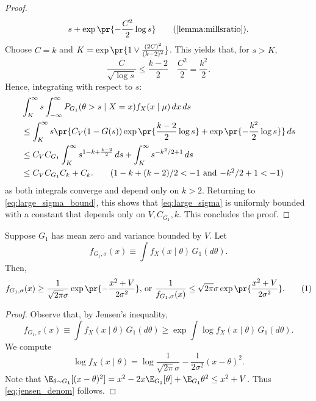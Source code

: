 \documentclass[12pt, reqno]{amsart}
\newcommand\numberthis{\addtocounter{equation}{1}\tag{\theequation}}
\numberwithin{equation}{section}
\begin{document}
\begin{refsection}
\begin{appendices}
\begin{proof}
\begin{align*}
{s} + \exp\pr{-\frac{C^2}{2} \log s} \tag{\cref{lemma:millsratio}}.
\end{align*}
Choose $C = k$ and $ K = \exp\pr{1 \vee \frac{(2C)^2}{(k-2)^2}}$. This yields that, for
$s > K$, \[
\frac{C}{\sqrt{\log s}}  \le \frac{k-2}{2} \quad \frac{C^2}{2} = \frac{k^2}{2}.
\]
Hence, integrating with respect to $s$: \begin{align*}
&\int_K^\infty s \int_{-\infty}^\infty P_{G_1}(\theta > s \mid X=x) f_X
(x\mid \mu)\,dx\,ds \\
&\le \int_K^\infty s 
\pr{C_V (1-G(s)) \exp\pr{ \frac{k-2}{2} \log
s} + \exp\pr{-\frac{k^2}{2} \log s}} \,ds \\
&\le C_{V} C_{G_1} \int_K^\infty s^{1-k+\frac{k-2}{2}}\,ds + \int_{K}^\infty s^{-k^2/2 +1}
\,ds \\
&\le C_V C_{G_1} C_k + C_k. \tag{$1-k+(k-2)/2 < -1$ and $-k^2/2+1 < -1$}
\end{align*}
as both integrals converge and depend only on $k > 2$. Returning to 
\eqref{eq:large_sigma_bound}, this shows that \eqref{eq:large_sigma} is uniformly bounded
with a constant that depends only on $V, C_{G_1}, k$. This concludes the proof.
\end{proof}

\begin{lemma}
\label{lemma:jensen_denom}
Suppose $G_1$ has mean zero and variance bounded by $V$. Let \[
f_{G_1, \sigma}(x) \equiv \int f_X(x\mid \theta) \, G_1(d\theta).
\] Then, \[
f_{G_1,\sigma}(x) \ge \frac{1}{\sqrt{2\pi}\sigma} \exp\pr{-\frac{x^2 + V}
{2\sigma^2}}
\text{, or }
\frac{1}{f_{G_1, \sigma}(x)} \le \sqrt{2\pi} \sigma \exp\pr{\frac{x^2 + V}{2\sigma^2}}.
\numberthis \label{eq:jensen_denom}
\]
\end{lemma}

\begin{proof}
Observe that, by Jensen's inequality, \[
f_{G_1, \sigma}(x) \equiv \int f_X(x\mid \theta) \, G_1(d\theta) \ge \exp \int \log f_X
(x\mid
\theta) \,G_1(d\theta).
\]
We compute \[
\log f_X(x \mid \theta) = \log\frac{1}{\sqrt{2\pi} \sigma} - \frac{1}{2\sigma^2} 
(x-\theta)^2. 
\]
Note that $\E_{\theta \sim G_1}[(x-\theta)^2] = x^2 - 2x \E_{G_1}[\theta] + \E_
{G_1}\theta^2 \le x^2 + V$.
Thus \eqref{eq:jensen_denom} follows. \end{proof}



\end{appendices}
\end{refsection}
\end{document}
